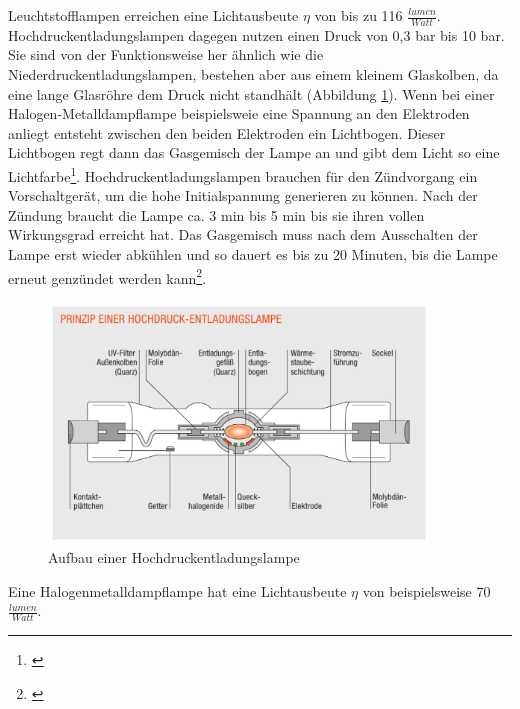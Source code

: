 \noindent Leuchtstofflampen erreichen eine Lichtausbeute $\eta$ von bis zu 116 $\frac{lumen}{Watt}$.\\

\noindent Hochdruckentladungslampen dagegen nutzen einen Druck von 0,3 bar bis 10 bar. Sie sind von der Funktionsweise her ähnlich wie die Niederdruckentladungslampen, bestehen aber aus einem kleinem Glaskolben, da eine lange Glasröhre dem Druck nicht standhält (Abbildung \ref{b_hochdruck}). Wenn bei einer Halogen-Metalldampflampe beispielsweie eine Spannung an den Elektroden anliegt entsteht zwischen den beiden Elektroden ein Lichtbogen. Dieser Lichtbogen regt dann das Gasgemisch der Lampe an und gibt dem Licht so eine Lichtfarbe\footnote{\cite[129]{ris}}.
Hochdruckentladungslampen brauchen für den Zündvorgang ein Vorschaltgerät, um die hohe Initialspannung generieren zu können. Nach der Zündung braucht die Lampe ca. 3 min bis 5 min bis sie ihren vollen Wirkungsgrad erreicht hat. Das Gasgemisch muss nach dem Ausschalten der Lampe erst wieder abkühlen und so dauert es bis zu 20 Minuten, bis die Lampe erneut genzündet werden kann\footnote{\cite[147]{mueller}}.

\begin{figure}[htp]     %
\centering
\includegraphics[width=0.9\textwidth]{bilder/hochdruck} 
\caption {Aufbau einer Hochdruckentladungslampe\protect\footnotemark}\label{b_hochdruck}
\end{figure}
\noindent Eine Halogenmetalldampflampe hat eine Lichtausbeute $\eta$ von beispielsweise 70 $\frac{lumen}{Watt}$.

